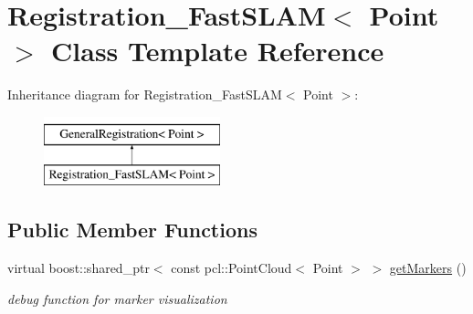 \hypertarget{classRegistration__FastSLAM}{
\section{Registration\_\-FastSLAM$<$ Point $>$ Class Template Reference}
\label{classRegistration__FastSLAM}
}
Inheritance diagram for Registration\_\-FastSLAM$<$ Point $>$:\begin{figure}[H]
\begin{center}
\leavevmode
\includegraphics[height=2.000000cm]{classRegistration__FastSLAM}
\end{center}
\end{figure}
\subsection*{Public Member Functions}
\begin{DoxyCompactItemize}
\item 
\hypertarget{classRegistration__FastSLAM_ae7ed9dcde8de4c5b5669e407db039049}{
virtual boost::shared\_\-ptr$<$ const pcl::PointCloud$<$ Point $>$ $>$ \hyperlink{classRegistration__FastSLAM_ae7ed9dcde8de4c5b5669e407db039049}{getMarkers} ()}
\label{classRegistration__FastSLAM_ae7ed9dcde8de4c5b5669e407db039049}

\begin{DoxyCompactList}\small\item\em debug function for marker visualization \item\end{DoxyCompactList}\end{DoxyCompactItemize}
